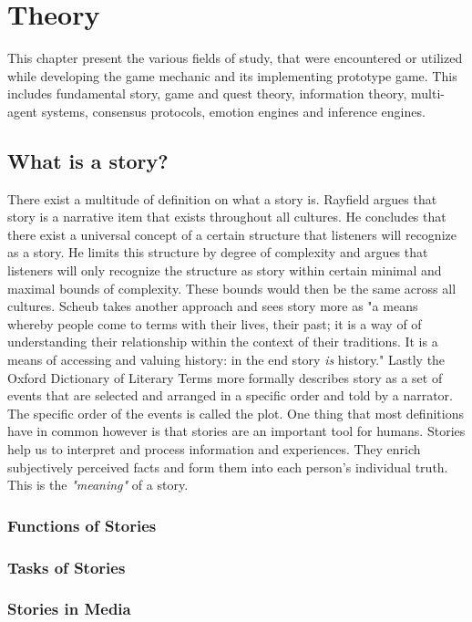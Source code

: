 \chapter{Theory} %
This chapter present the various fields of study, that were encountered or utilized while developing the game mechanic and its implementing prototype game. This includes fundamental story, game and quest theory, information theory, multi-agent systems, consensus protocols, emotion engines and inference engines.
\section{What is a story?}
There exist a multitude of definition on what a story is. Rayfield argues that story is a narrative item that exists throughout all cultures. He concludes that there exist a universal concept of a certain structure that listeners will recognize as a story. He limits this structure by degree of complexity and argues that listeners will only recognize the structure as story within certain minimal and maximal bounds of complexity. These bounds would then be the same across all cultures. \cite{Rayfield1972} Scheub takes another approach and sees story more as "a means whereby people come to terms with their lives, their past; it is a way of of understanding their relationship within the context of their traditions. It is a means of accessing and valuing history: in the end story \textit{is} history." \cite{Scheub1998} Lastly the Oxford Dictionary of Literary Terms more formally describes story as a set of events that are selected and arranged in a specific order and told by a narrator. The specific order of the events is called the plot. \cite{OXFORD} One thing that most definitions have in common however is that stories are an important tool for humans. Stories help us to interpret and process information and experiences. They enrich subjectively perceived facts and form them into each person's individual truth. This is the \textit{"meaning"} of a story.

\subsection{Functions of Stories}
\subsection{Tasks of Stories}
\subsection{Stories in Media}
